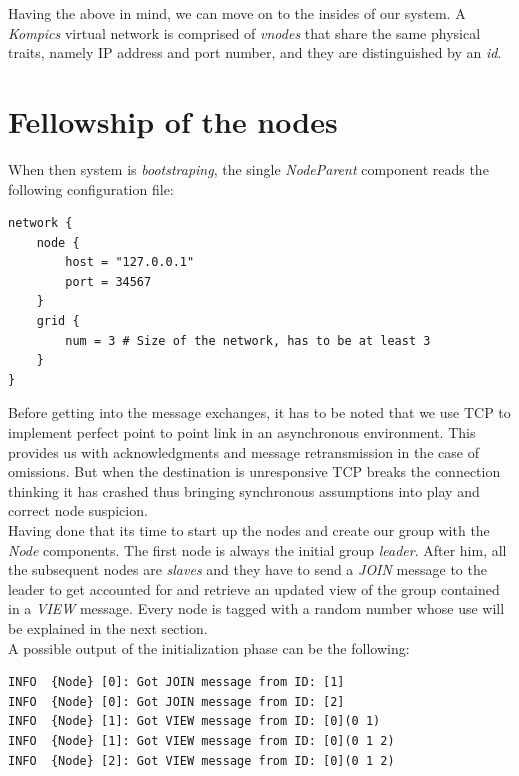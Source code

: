 \documentclass[a4paper, 11pt]{article}
\begin{document}
\noindent Having the above in mind, we can move on to the insides of our system. A \textit{Kompics} virtual network is comprised of \textit{vnodes} that share the same physical traits, namely IP address and port number, and they are distinguished by an \textit{id}. \\

\section{Fellowship of the nodes}

\noindent When then system is \textit{bootstraping}, the single \textit{NodeParent} component reads the following configuration file: 

\begin{verbatim}
network {
    node {
        host = "127.0.0.1"
        port = 34567
    }
    grid {
        num = 3 # Size of the network, has to be at least 3
    }
}
\end{verbatim}

\noindent Before getting into the message exchanges, it has to be noted that we use TCP to implement perfect point to point link in an asynchronous environment. This provides us with acknowledgments and message retransmission in the case of omissions. But when the destination is unresponsive TCP breaks the connection thinking it has crashed thus bringing synchronous assumptions into play and correct node suspicion.\\

\noindent Having done that its time to start up the nodes and create our group with the \textit{Node} components. The first node is always the initial group \textit{leader}. After him, all the subsequent nodes are \textit{slaves} and they have to send a \textit{JOIN} message to the leader to get accounted for and retrieve an updated view of the group contained in a \textit{VIEW} message. Every node is tagged with a random number whose use will be explained in the next section. \\

\noindent A possible output of the initialization phase can be the following:

\begin{verbatim}
INFO  {Node} [0]: Got JOIN message from ID: [1]
INFO  {Node} [0]: Got JOIN message from ID: [2]
INFO  {Node} [1]: Got VIEW message from ID: [0](0 1)
INFO  {Node} [1]: Got VIEW message from ID: [0](0 1 2)
INFO  {Node} [2]: Got VIEW message from ID: [0](0 1 2)
\end{verbatim}
\end{document}
